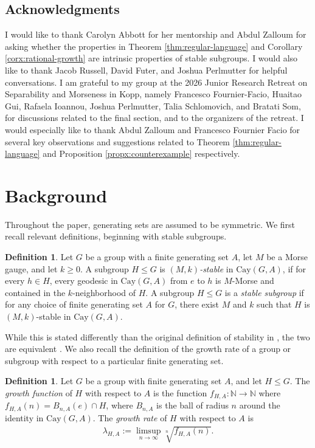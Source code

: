 \documentclass[11pt,letterpaper]{amsart}
\theoremstyle{definition}
\newtheorem{definition}[theorem]{Definition}
\theoremstyle{plain}
\theoremstyle{TheoremNum}
\begin{document}
\subsection{Acknowledgments}
 I would like to thank Carolyn Abbott for her mentorship and Abdul Zalloum for asking whether the properties in Theorem \ref{thm:regular-language} and Corollary \ref{corx:rational-growth} are intrinsic properties of stable subgroups. I would also like to thank Jacob Russell, David Futer, and Joshua Perlmutter for helpful conversations. I am grateful to my group at the 2026 Junior Research Retreat on Separability and Morseness in Kopp, namely Francesco Fournier-Facio, Huaitao Gui, Rafaela Ioannou, Joshua Perlmutter, Talia Schlomovich, and Bratati Som, for discussions related to the final section, and to the organizers of the retreat. I would especially like to thank Abdul Zalloum and Francesco Fournier Facio for several key observations and suggestions related to Theorem \ref{thm:regular-language} and Proposition \ref{propx:counterexample} respectively.

\section{Background}
Throughout the paper, generating sets are assumed to be symmetric. We first recall relevant definitions, beginning with stable subgroups.

\begin{definition}\cite[Definition~2.22]{CRSZ}
    Let $G$ be a group with a finite generating set $A$, let $M$ be a Morse gauge, and let $k\geq 0$. A subgroup $H\leq G$ is \textit{$(M,k)$-stable} in $\text{Cay}(G,A)$, if for every $h\in H$, every geodesic in $\text{Cay}(G,A)$ from $e$ to $h$ is $M$-Morse and contained in the $k$-neighborhood of $H$. A subgroup $H\leq G$ is a \textit{stable subgroup} if for any choice of finite generating set $A$ for $G$, there exist $M$ and $k$ such that $H$ is $(M,k)$-stable in $\text{Cay}(G,A)$.
\end{definition}
While this is stated differently than the original definition of stability in \cite{Durham-Taylor-stability}, the two are equivalent \cite{Cordes-Hume-stability}. We also recall the definition of the growth rate of a group or subgroup with respect to a particular finite generating set. 

\begin{definition}
    Let $G$ be a group with finite generating set $A$, and let $H \leq G$. The \emph{growth function} of $H$ with respect to $A$ is the function $f_{H,A}: \mathbb{N} \rightarrow \mathbb{N}$ where $f_{H,A}(n) = B_{n,A}(e) \cap H$, where $B_{n,A}$ is the ball of radius $n$ around the identity in $\text{Cay}(G,A)$. The \emph{growth rate} of $H$ with respect to $A$ is
\begin{align*}
    \lambda_{H,A} := \limsup_{n \rightarrow \infty} \sqrt[n]{f_{H,A}(n)}\text{.}
\end{align*}
\end{definition}
\end{document}
